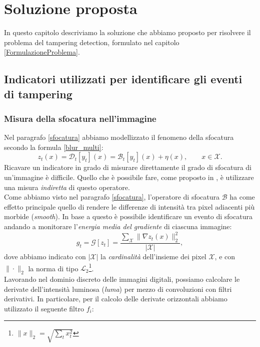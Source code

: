 \chapter{Soluzione proposta}
\label{SoluzioneProposta}
\thispagestyle{empty}

\vspace{0.5cm}

\noindent In questo capitolo descriviamo la soluzione che abbiamo proposto per risolvere il problema del tampering detection, formulato nel capitolo \ref{FormulazioneProblema}.
\section{Indicatori utilizzati per identificare gli eventi di tampering}
\subsection{Misura della sfocatura nell'immagine}
Nel paragrafo \ref{sfocatura} abbiamo modellizzato il fenomeno della sfocatura secondo la formula \eqref{blur_multi}:
\[z_t(x)=\mathcal{D}_t[y_t](x) = \mathcal{B}_t[y_t](x) + \eta(x), \qquad x \in \mathcal{X}.\]
Ricavare un indicatore in grado di misurare direttamente il grado di sfocatura di un'immagine \`e difficile.
Quello che \`e possibile fare, come proposto in \cite{alippi2010detecting}, \`e utilizzare una misura \textit{indiretta} di questo operatore.\\
Come abbiamo visto nel paragrafo \ref{sfocatura}, l'operatore di sfocatura $\mathcal{B}$ ha come effetto principale quello di rendere le differenze di intensit\`a tra pixel adiacenti pi\`u morbide (\textit{smooth}).
In base a questo \`e possibile identificare un evento di sfocatura andando a monitorare l'\textit{energia media del gradiente} di ciascuna immagine:
\begin{equation}
\label{eq:energyGradient}
g_t = \mathcal{G}[z_t] =\frac{\sum_{\mathcal{X}}\| \nabla z_t(x) \| _2^2 }{|\mathcal{X}|} ,
\end{equation}  
dove abbiamo indicato con $|\mathcal{X}|$ la \textit{cardinalit\`a} dell'insieme dei pixel $\mathcal{X}$, e con $\|\cdot\|_2$ la norma di tipo $\mathcal{L}_2$\footnote{$\|x\|_2=\sqrt{\sum_{t}x_t^2}$}.\\
Lavorando nel dominio discreto delle immagini digitali, possiamo calcolare le derivate dell'intensit\`a luminosa (\textit{luma}) per mezzo di convoluzioni con filtri derivativi.
In particolare, per il calcolo delle derivate orizzontali  abbiamo utilizzato il seguente filtro $f_i$:
